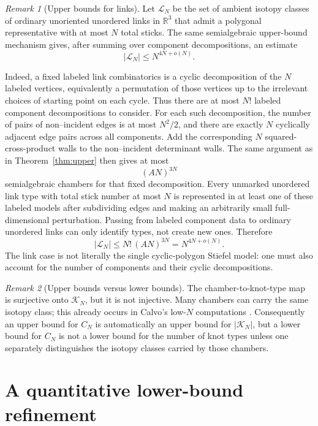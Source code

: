 \documentclass[11pt]{article}
\theoremstyle{remark}
\newtheorem{remark}{Remark}
\theoremstyle{plain}
\newcommand{\R}{\mathbb{R}}
\newcommand{\Kcal}{\mathcal{K}}
\newcommand{\Lcal}{\mathcal{L}}
\begin{document}
\begin{remark}[Upper bounds for links]\label{rem:link-upper}
Let \(\Lcal_N\) be the set of ambient isotopy classes of ordinary unoriented
unordered links in \(\R^3\) that admit a polygonal representative with at most
\(N\) total sticks.  The same semialgebraic upper-bound mechanism gives, after
summing over component decompositions, an estimate
\[
    |\Lcal_N|\le N^{4N+o(N)}.
\]

Indeed, a fixed labeled link combinatorics is a cyclic decomposition of the
\(N\) labeled vertices, equivalently a permutation of those vertices up to the
irrelevant choices of starting point on each cycle.  Thus there are at most
\(N!\) labeled component decompositions to consider.  For each such
decomposition, the number of pairs of non--incident edges is at most \(N^2/2\),
and there are exactly \(N\) cyclically adjacent edge pairs across all
components.  Add the corresponding \(N\) squared-cross-product walls to the
non--incident determinant walls.  The same argument as in
Theorem~\ref{thm:upper} then gives at
most
\[
    (A N)^{3N}
\]
semialgebraic chambers for that fixed decomposition.  Every unmarked unordered
link type with total stick number at most \(N\) is represented in at least one
of these labeled models after subdividing edges and making an arbitrarily small
full-dimensional perturbation.  Passing from labeled component data to ordinary
unordered links can only identify types, not create new ones.  Therefore
\[
    |\Lcal_N|
    \le
    N!\,(A N)^{3N}
    =
    N^{4N+o(N)}.
\]
The link case is not literally the single cyclic-polygon Stiefel model: one
must also account for the number of components and their cyclic decompositions.
\end{remark}

\begin{remark}[Upper bounds versus lower bounds]
The chamber-to-knot-type map is surjective onto \(\Kcal_N\), but it is not
injective.  Many chambers can carry the same isotopy class; this already occurs
in Calvo's low-\(N\) computations \cite{Calvo}.  Consequently an upper bound for
\(C_N\) is automatically an upper bound for \(|\Kcal_N|\), but a lower bound for
\(C_N\) is not a lower bound for the number of knot types unless one separately
distinguishes the isotopy classes carried by those chambers.
\end{remark}

\section{A quantitative lower-bound refinement}
\end{document}
